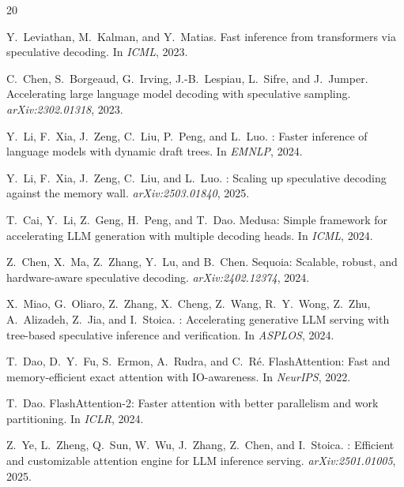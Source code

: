 \documentclass{article}
\begin{document}

\begin{thebibliography}{20}

Y.~Leviathan, M.~Kalman, and Y.~Matias.
\newblock Fast inference from transformers via speculative decoding.
\newblock In \emph{ICML}, 2023.

C.~Chen, S.~Borgeaud, G.~Irving, J.-B.~Lespiau, L.~Sifre, and J.~Jumper.
\newblock Accelerating large language model decoding with speculative sampling.
\newblock \emph{arXiv:2302.01318}, 2023.

Y.~Li, F.~Xia, J.~Zeng, C.~Liu, P.~Peng, and L.~Luo.
: Faster inference of language models with dynamic draft trees.
\newblock In \emph{EMNLP}, 2024.

Y.~Li, F.~Xia, J.~Zeng, C.~Liu, and L.~Luo.
: Scaling up speculative decoding against the memory wall.
\newblock \emph{arXiv:2503.01840}, 2025.

T.~Cai, Y.~Li, Z.~Geng, H.~Peng, and T.~Dao.
\newblock Medusa: Simple framework for accelerating {LLM} generation with
  multiple decoding heads.
\newblock In \emph{ICML}, 2024.

Z.~Chen, X.~Ma, Z.~Zhang, Y.~Lu, and B.~Chen.
\newblock Sequoia: Scalable, robust, and hardware-aware speculative decoding.
\newblock \emph{arXiv:2402.12374}, 2024.

X.~Miao, G.~Oliaro, Z.~Zhang, X.~Cheng, Z.~Wang, R.~Y.~Wong, Z.~Zhu,
  A.~Alizadeh, Z.~Jia, and I.~Stoica.
: Accelerating generative {LLM} serving with tree-based
  speculative inference and verification.
\newblock In \emph{ASPLOS}, 2024.

T.~Dao, D.~Y.~Fu, S.~Ermon, A.~Rudra, and C.~R{\'e}.
\newblock Flash{A}ttention: Fast and memory-efficient exact attention with
  {IO}-awareness.
\newblock In \emph{NeurIPS}, 2022.

T.~Dao.
\newblock Flash{A}ttention-2: Faster attention with better parallelism and work
  partitioning.
\newblock In \emph{ICLR}, 2024.

Z.~Ye, L.~Zheng, Q.~Sun, W.~Wu, J.~Zhang, Z.~Chen, and I.~Stoica.
: Efficient and customizable attention engine for {LLM}
  inference serving.
\newblock \emph{arXiv:2501.01005}, 2025.


\end{thebibliography}
\end{document}
